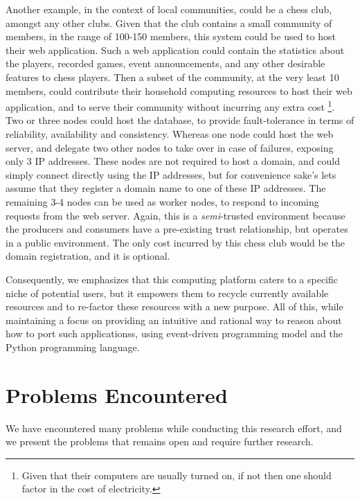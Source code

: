\documentclass[12pt, titlepage]{uo_temp}
\begin{document}
     Another example, in the context of local communities, could be a chess club, amongst
     any other clubs. Given that the club contains a small community of members, in the
     range of 100-150 members, this system could be used to host their web
     application. Such a web application could contain the statistics about the players,
     recorded games, event announcements, and any other desirable features to chess
     players. Then a subset of the community, at the very least 10 members, could
     contribute their household computing resources to host their web application, and to
     serve their community without incurring any extra cost \footnote{Given that their
       computers are usually turned on, if not then one should factor in the cost of
       electricity.}. Two or three nodes could host the database, to provide
     fault-tolerance in terms of reliability, availability and consistency. Whereas one
     node could host the web server, and delegate two other nodes to take over in case of
     failures, exposing only 3 IP addresses. These nodes are not required to host a
     domain, and could simply connect directly using the IP addresses, but for convenience
     sake's lets assume that they register a domain name to one of these IP addresses. The
     remaining 3-4 nodes can be used as worker nodes, to respond to incoming requests from
     the web server. Again, this is a \emph{semi}-trusted environment because the
     producers and consumers have a pre-existing trust relationship, but operates in a
     public environment. The only cost incurred by this chess club would be the domain
     registration, and it is optional.
     
     Consequently, we emphasizes that this computing platform caters to a specific niche
     of potential users, but it empowers them to recycle currently available resources and
     to re-factor these resources with a new purpose. All of this, while maintaining a
     focus on providing an intuitive and rational way to reason about how to port such
     applicationss, using event-driven programming model and the Python programming language.
   
     \section{Problems Encountered}
     We have encountered many problems while conducting this research effort, and
     we present the problems that remains open and require further research. \\
\end{document}
